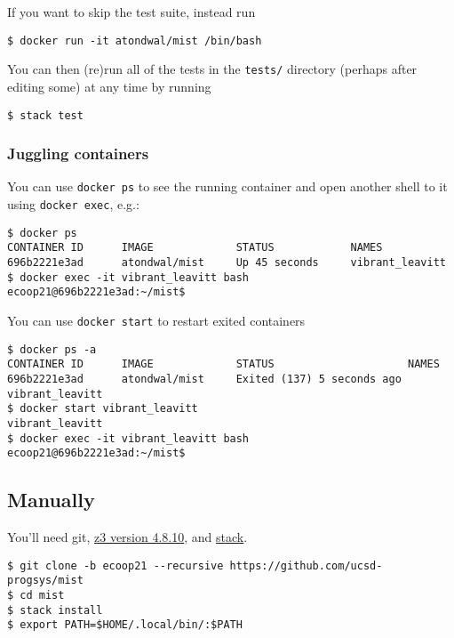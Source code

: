 \documentclass[
]{darts-v2021}
\begin{document}
If you want to skip the test suite, instead run

\begin{verbatim}
$ docker run -it atondwal/mist /bin/bash
\end{verbatim}

You can then (re)run all of the tests in the \texttt{tests/} directory
(perhaps after editing some) at any time by running

\begin{verbatim}
$ stack test
\end{verbatim}

\hypertarget{juggling-containers}{%
\subsubsection{Juggling containers}\label{juggling-containers}}

You can use \texttt{docker\ ps} to see the running container and open
another shell to it using \texttt{docker\ exec}, e.g.:

\begin{verbatim}
$ docker ps
CONTAINER ID      IMAGE             STATUS            NAMES
696b2221e3ad      atondwal/mist     Up 45 seconds     vibrant_leavitt
$ docker exec -it vibrant_leavitt bash
ecoop21@696b2221e3ad:~/mist$
\end{verbatim}

You can use \texttt{docker\ start} to restart exited containers

\begin{verbatim}
$ docker ps -a
CONTAINER ID      IMAGE             STATUS                     NAMES
696b2221e3ad      atondwal/mist     Exited (137) 5 seconds ago vibrant_leavitt
$ docker start vibrant_leavitt
vibrant_leavitt
$ docker exec -it vibrant_leavitt bash
ecoop21@696b2221e3ad:~/mist$
\end{verbatim}

\hypertarget{manually}{%
\subsection{Manually}\label{manually}}

You'll need git, \href{https://github.com/Z3Prover/z3/releases}{z3
version 4.8.10}, and
\href{https://docs.haskellstack.org/en/stable/README/}{stack}.

\begin{verbatim}
$ git clone -b ecoop21 --recursive https://github.com/ucsd-progsys/mist
$ cd mist
$ stack install
$ export PATH=$HOME/.local/bin/:$PATH
\end{verbatim}
\end{document}
